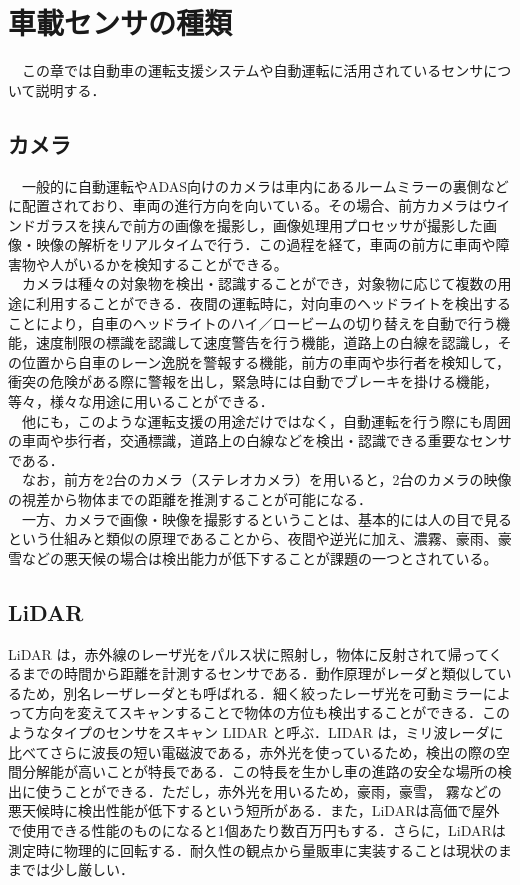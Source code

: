 \chapter{車載センサの種類}
　この章では自動車の運転支援システムや自動運転に活用されているセンサについて説明する．
\section{カメラ}
　一般的に自動運転やADAS向けのカメラは車内にあるルームミラーの裏側などに配置されており、車両の進行方向を向いている。その場合、前方カメラはウインドガラスを挟んで前方の画像を撮影し，画像処理用プロセッサが撮影した画像・映像の解析をリアルタイムで行う．この過程を経て，車両の前方に車両や障害物や人がいるかを検知することができる。\cite{jidountenlab_sensor}\\
　カメラは種々の対象物を検出・認識することができ，対象物に応じて複数の用途に利用することができる．夜間の運転時に，対向車のヘッドライトを検出することにより，自車のヘッドライトのハイ／ロービームの切り替えを自動で行う機能，速度制限の標識を認識して速度警告を行う機能，道路上の白線を認識し，その位置から自車のレーン逸脱を警報する機能，前方の車両や歩行者を検知して，衝突の危険がある際に警報を出し，緊急時には自動でブレーキを掛ける機能，等々，様々な用途に用いることができる．\\
　他にも，このような運転支援の用途だけではなく，自動運転を行う際にも周囲の車両や歩行者，交通標識，道路上の白線などを検出・認識できる重要なセンサである．\\
　なお，前方を2台のカメラ（ステレオカメラ）を用いると，2台のカメラの映像の視差から物体までの距離を推測することが可能になる．\cite{denso_sensor}\\
　一方、カメラで画像・映像を撮影するということは、基本的には人の目で見るという仕組みと類似の原理であることから、夜間や逆光に加え、濃霧、豪雨、豪雪などの悪天候の場合は検出能力が低下することが課題の一つとされている。\cite{jidountenlab_sensor}\\

\section{LiDAR}
LiDAR は，赤外線のレーザ光をパルス状に照射し，物体に反射されて帰ってくるまでの時間から距離を計測するセンサである．動作原理がレーダと類似しているため，別名レーザレーダとも呼ばれる．細く絞ったレーザ光を可動ミラーによって方向を変えてスキャンすることで物体の方位も検出することができる．このようなタイプのセンサをスキャン LIDAR と呼ぶ．LIDAR は，ミリ波レーダに比べてさらに波長の短い電磁波である，赤外光を使っているため，検出の際の空間分解能が高いことが特長である．この特長を生かし車の進路の安全な場所の検出に使うことができる．ただし，赤外光を用いるため，豪雨，豪雪，
霧などの悪天候時に検出性能が低下するという短所がある．\cite{denso_sensor}また，LiDARは高価で屋外で使用できる性能のものになると1個あたり数百万円もする．さらに，LiDARは測定時に物理的に回転する．耐久性の観点から量販車に実装することは現状のままでは少し厳しい．\cite{MITTechnologyReview_sensor}

